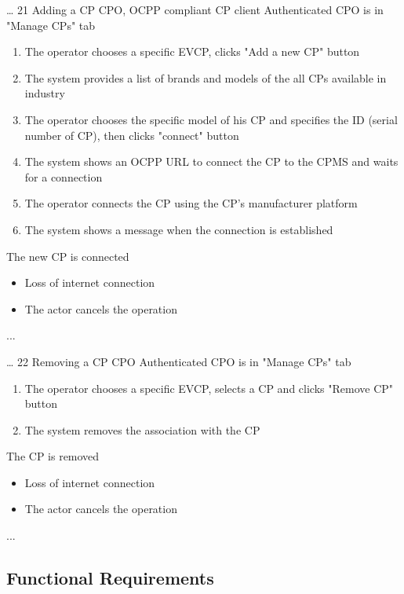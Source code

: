 \usecase
{
    \dots %
}
{21}
{Adding a CP} %
{CPO, OCPP compliant CP client} %
{Authenticated CPO is in "Manage CPs" tab} %
{ %
    \begin{enumerate}
        \item The operator chooses a specific EVCP, clicks "Add a new CP" button
        \item The system provides a list of brands and models of the all CPs available in industry
        \item The operator chooses the specific model of his CP and specifies the ID (serial number of CP), then clicks "connect" button
        \item The system shows an OCPP URL to connect the CP to the CPMS and waits for a connection
        \item The operator connects the CP using the CP's manufacturer platform
        \item The system shows a message when the connection is established
    \end{enumerate}
}
{The new CP is connected} %
{ %
    \begin{itemize}
        \item Loss of internet connection
        \item The actor cancels the operation
    \end{itemize}
}
{ %
    ...
}

\usecase
{
    \dots %
}
{22}
{Removing a CP} %
{CPO} %
{Authenticated CPO is in "Manage CPs" tab} %
{ %
    \begin{enumerate}
        \item The operator chooses a specific EVCP, selects a CP and clicks "Remove CP" button
        \item The system removes the association with the CP
    \end{enumerate}
}
{The CP is removed} %
{ %
    \begin{itemize}
        \item Loss of internet connection
        \item The actor cancels the operation
    \end{itemize}
}
{ %
    ...
}

\subsection{Functional Requirements}


